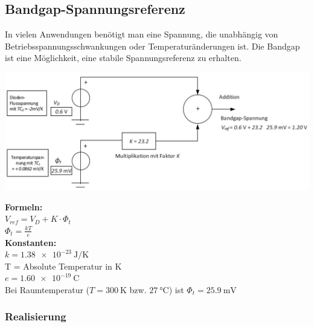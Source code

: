 \subsection{Bandgap-Spannungsreferenz}
In vielen Anwendungen benötigt man eine Spannung, die unabhängig von Betriebsspannungsschwankungen oder Temperaturänderungen ist.
Die Bandgap ist eine Möglichkeit, eine stabile Spannungsreferenz zu erhalten.\\
\begin{minipage}[c]{0.5\textwidth}
	\includegraphics[width=1\linewidth]{chapters/Spannungsref/images/Bandgap}
\end{minipage}
\begin{minipage}[c]{0.5\textwidth}
	\textbf{Formeln:}\\
	$V_{ref} = V_D + K\cdot \Phi_t$\\
	$\Phi_t = \frac{kT}{e}$\\[2ex]
	\textbf{Konstanten:}\\
	$k = \SI{1.38e-23}{\joule / \kelvin}$\\
	T = Absolute Temperatur in K\\
	$e = \SI{1.60e-19}{\coulomb}$\\
	Bei Raumtemperatur ($T=\SI{300}{\kelvin}$ bzw. $\SI{27}{\degreeCelsius}$) ist $\Phi_t = \SI{25.9}{\milli\volt}$
\end{minipage}
\subsubsection{Realisierung}
